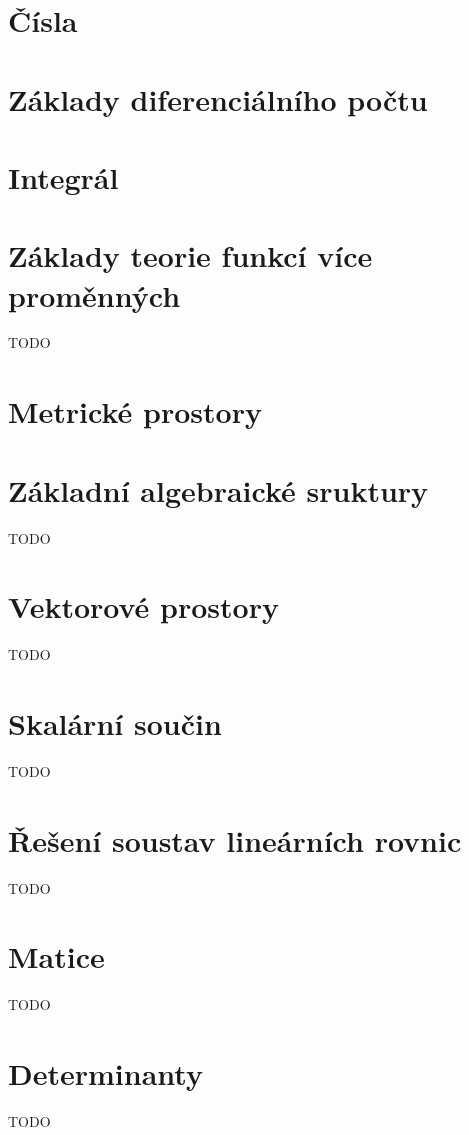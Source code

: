 


\section{Čísla}


\section{Základy diferenciálního počtu}


\section{Integrál}


\section{Základy teorie funkcí více proměnných}
TODO

\section{Metrické prostory}


\section{Základní algebraické sruktury}
TODO

\section{Vektorové prostory}
TODO

\section{Skalární součin}
TODO

\section{Řešení soustav lineárních rovnic}
TODO

\section{Matice}
TODO

\section{Determinanty}
TODO

